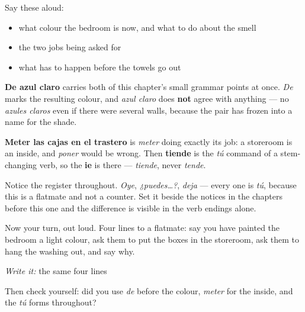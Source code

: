 Say these aloud:

\begin{itemize}
\raggedright
  \item what colour the bedroom is now, and what to do about the smell
  \item the two jobs being asked for
  \item what has to happen before the towels go out
\end{itemize}

\begin{culture}
\textbf{De azul claro} carries both of this chapter's small grammar points at once. \emph{De} marks the resulting colour, and \emph{azul claro} does \textbf{not} agree with anything — no \emph{azules claros} even if there were several walls, because the pair has frozen into a name for the shade.

\textbf{Meter las cajas en el trastero} is \emph{meter} doing exactly its job: a storeroom is an inside, and \emph{poner} would be wrong. Then \textbf{tiende} is the \emph{tú} command of a stem-changing verb, so the \textbf{ie} is there — \emph{tiende}, never \emph{tende}.

Notice the register throughout. \emph{Oye}, \emph{¿puedes…?}, \emph{deja} — every one is \emph{tú}, because this is a flatmate and not a counter. Set it beside the notices in the chapters before this one and the difference is visible in the verb endings alone.
\end{culture}

\begin{tcolorbox}[breakable,colback=teal!4,colframe=teal!35!black,title={Before you move on}]
Now your turn, out loud. Four lines to a flatmate: say you have painted the bedroom a light colour, ask them to put the boxes in the storeroom, ask them to hang the washing out, and say why.

\emph{Write it:} the same four lines

Then check yourself: did you use \emph{de} before the colour, \emph{meter} for the inside, and the \emph{tú} forms throughout?
\end{tcolorbox}
